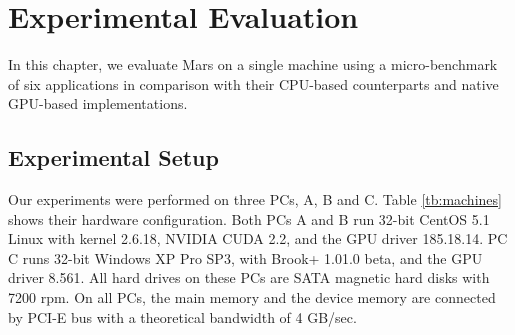 \chapter{Experimental Evaluation}\label{sec-eval}
In this chapter, we evaluate Mars on a single machine using a micro-benchmark of six applications in comparison with their CPU-based counterparts and native GPU-based implementations.


\section{Experimental Setup}
Our experiments were performed on three PCs, A, B and
 C. Table \ref{tb:machines} shows their hardware configuration.
Both PCs A and B run 32-bit CentOS 5.1 Linux with kernel
2.6.18, NVIDIA CUDA 2.2, and the GPU driver 185.18.14. PC C runs
32-bit Windows XP Pro SP3, with Brook+ 1.01.0 beta, and the GPU
driver 8.561. All hard drives on these PCs are SATA magnetic hard
disks with 7200 rpm. On all PCs, the main memory and the device
memory are connected by PCI-E bus with a theoretical bandwidth of 4
GB/sec.

\doublerulesep 0.1pt
\begin{table}[htb]
  \centering
\end{table}



